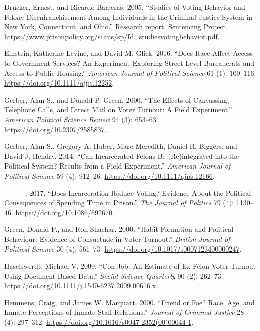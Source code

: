 \documentclass[
  12pt,
]{article}
\newlength{\cslhangindent}
\newenvironment{cslreferences}%
  {\setlength{\parindent}{0pt}%
  \everypar{\setlength{\hangindent}{\cslhangindent}}\ignorespaces}%
  {\par}
\begin{document}
\begin{cslreferences}
\leavevmode\hypertarget{ref-Drucker2005}{}%
Drucker, Ernest, and Ricardo Barreras. 2005. ``Studies of Voting Behavior and Felony Disenfranchisement Among Individuals in the Criminal Justice System in New York, Connecticut, and Ohio.'' Research report. Sentencing Project. \url{https://www.prisonpolicy.org/scans/sp/fd_studiesvotingbehavior.pdf}.

\leavevmode\hypertarget{ref-Einstein2016}{}%
Einstein, Katherine Levine, and David M. Glick. 2016. ``Does Race Affect Access to Government Services? An Experiment Exploring Street-Level Bureaucrats and Access to Public Housing.'' \emph{American Journal of Political Science} 61 (1): 100--116. \url{https://doi.org/10.1111/ajps.12252}.

\leavevmode\hypertarget{ref-Gerber2000}{}%
Gerber, Alan S., and Donald P. Green. 2000. ``The Effects of Canvassing, Telephone Calls, and Direct Mail on Voter Turnout: A Field Experiment.'' \emph{American Political Science Review} 94 (3): 653--63. \url{https://doi.org/10.2307/2585837}.

\leavevmode\hypertarget{ref-Gerber2014}{}%
Gerber, Alan S., Gregory A. Huber, Marc Meredith, Daniel R. Biggers, and David J. Hendry. 2014. ``Can Incarcerated Felons Be (Re)integrated into the Political System? Results from a Field Experiment.'' \emph{American Journal of Political Science} 59 (4): 912--26. \url{https://doi.org/10.1111/ajps.12166}.

\leavevmode\hypertarget{ref-Gerber2017}{}%
---------. 2017. ``Does Incarceration Reduce Voting? Evidence About the Political Consequences of Spending Time in Prison.'' \emph{The Journal of Politics} 79 (4): 1130--46. \url{https://doi.org/10.1086/692670}.

\leavevmode\hypertarget{ref-Green2000}{}%
Green, Donald P., and Ron Shachar. 2000. ``Habit Formation and Political Behaviour: Evidence of Consuetude in Voter Turnout.'' \emph{British Journal of Political Science} 30 (4): 561--73. \url{https://doi.org/10.1017/s0007123400000247}.

\leavevmode\hypertarget{ref-Haselswerdt2009}{}%
Haselswerdt, Michael V. 2009. ``Con Job: An Estimate of Ex-Felon Voter Turnout Using Document-Based Data.'' \emph{Social Science Quarterly} 90 (2): 262--73. \url{https://doi.org/10.1111/j.1540-6237.2009.00616.x}.

\leavevmode\hypertarget{ref-Hemmens2000}{}%
Hemmens, Craig, and James W. Marquart. 2000. ``Friend or Foe? Race, Age, and Inmate Perceptions of Inmate-Staff Relations.'' \emph{Journal of Criminal Justice} 28 (4): 297--312. \url{https://doi.org/10.1016/s0047-2352(00)00044-1}.


\end{cslreferences}
\end{document}
